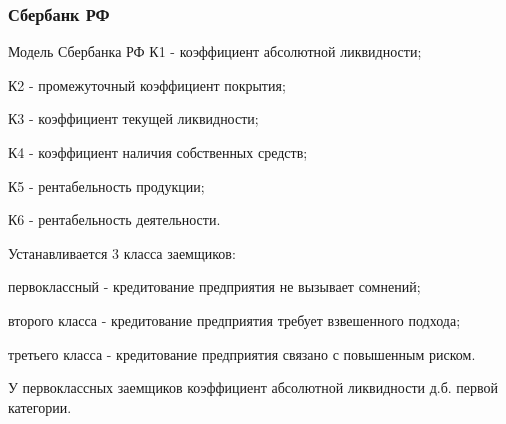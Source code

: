 \documentclass[_Banking_p2.tex]{subfiles}
\begin{document}

\subsubsection{Сбербанк РФ}
\begin{frame}[ allowframebreaks ]{Модель Сбербанка РФ}{}
К1 - коэффициент абсолютной ликвидности;

К2 - промежуточный коэффициент покрытия;

К3 - коэффициент текущей ликвидности;

К4 - коэффициент наличия собственных средств;

К5 - рентабельность продукции;

К6 - рентабельность деятельности.

\pagebreak
Устанавливается 3 класса заемщиков:

первоклассный - кредитование предприятия не вызывает сомнений;

второго класса - кредитование предприятия требует взвешенного подхода;

третьего класса - кредитование предприятия связано с повышенным риском.

\bigskip
У первоклассных заемщиков коэффициент абсолютной ликвидности д.б. первой категории.
\end{frame}
\end{document}
